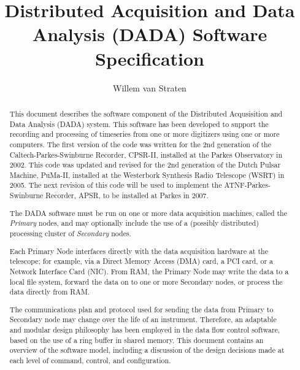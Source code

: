 \documentclass{scrreprt}
\begin{document}
\title{Distributed Acquisition and Data Analysis (DADA) Software Specification}

\author{Willem van Straten}

\maketitle
\tableofcontents{}

\begin{abstract}

This document describes the software component of the Distributed
Acqusisition and Data Analysis (DADA) system.  This software has been
developed to support the recording and processing of timeseries from
one or more digitizers using one or more computers.  The first version
of the code was written for the 2nd generation of the
Caltech-Parkes-Swinburne Recorder, CPSR-II, installed at the Parkes
Observatory in 2002.  This code was updated and revised for the 2nd
generation of the Dutch Pulsar Machine, PuMa-II, installed at the
Westerbork Synthesis Radio Telescope (WSRT) in 2005.  The next
revision of this code will be used to implement the
ATNF-Parkes-Swinburne Recorder, APSR, to be installed at Parkes in
2007.

The DADA software must be run on one or more data acquisition
machines, called the \emph{Primary} nodes, and may optionally include
the use of a (possibly distributed) processing cluster of
\emph{Secondary} nodes.

Each Primary Node interfaces directly with the data acquisition
hardware at the telescope; for example, via a Direct Memory Access
(DMA) card, a PCI card, or a Network Interface Card (NIC).  From RAM,
the Primary Node may write the data to a local file system, forward
the data on to one or more Secondary nodes, or process the data
directly from RAM.

The communications plan and protocol used for sending the data from
Primary to Secondary node may change over the life of an instrument.
Therefore, an adaptable and modular design philosophy has been
employed in the data flow control software, based on the use of a ring
buffer in shared memory.  This document contains an overview of the
software model, including a discussion of the design decisions made at
each level of command, control, and configuration.

\end{abstract}











\appendix








\end{document}
